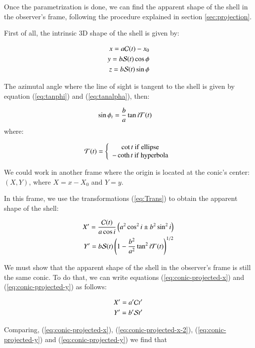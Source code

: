 Once the parametrization is done, we can find the apparent shape of the shell in the observer's frame, following the procedure explained in section \ref{sec:projection}.

First of all, the intrinsic 3D shape of the shell is given by:

\begin{align}
x = a\mathcal{C}(t)-x_0 \\ 
y = b\mathcal{S}(t)\cos\phi \\
z =  b\mathcal{S}(t)\sin\phi
\end{align}

The azimutal angle where the line of sight is tangent to the shell is given by equation (\ref{eq:tanphi}) and (\ref{eq:tanalpha}), then:

\begin{align}
\sin\phi_t &= \frac{b}{a}\tan i\mathcal{T}(t) 
\end{align}
where:

\begin{align}
\mathcal{T}(t) = \left\lbrace \begin{array}{c}
\cot t ~\mathrm{if~ellipse} \\
-\coth t ~\mathrm{if~hyperbola}
\end{array}\right.
\end{align}

We could work in another frame   where the origin is located at the conic's center: $(X,Y)$, where $X=x-X_0$ and $Y=y$.

In this frame,  we use the transformations (\ref{eq:Trans})  to obtain the apparent shape of the shell:

\begin{align}
X' = \frac{\mathcal{C}(t)}{a\cos i}\left(a^2\cos^2 i \pm b^2\sin^2 i\right)  \label{eq:conic-projected-x}\\
Y'= b\mathcal{S}(t)\left(1-\frac{b^2}{a^2}\tan^2 i\mathcal{T}(t)\right)^{1/2}
\label{eq:conic-projected-y}
\end{align}


We must show that the apparent shape of the shell in the observer's frame is still the same conic. To do that, we can write equations
(\ref{eq:conic-projected-x}) and (\ref{eq:conic-projected-y}) as follows:

\begin{align}
X' = a'\mathcal{C} t' \label{eq:conic-projected-x-2} \\
Y' = b'\mathcal{S} t' \label{eq:conic-projected-y-2}
\end{align}

Comparing, (\ref{eq:conic-projected-x}), (\ref{eq:conic-projected-x-2}), (\ref{eq:conic-projected-y}) and (\ref{eq:conic-projected-y}) we find that

